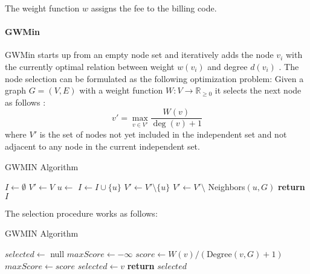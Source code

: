 The weight function $w$ assigns the fee to the billing code.




\paragraph{GWMin}
GWMin starts up from an empty node set and iteratively adds the node $v_i$ with the currently optimal relation between weight $w(v_i)$ and degree $d(v_i)$ \cite{SAKAI2003313}.
The node selection can be formulated as the following optimization problem:
Given a graph $G = (V, E)$ with a weight function $W: V \to \mathbb{R}_{\geq 0}$ it selects the next node as follows :
\[
    v' = \max_{v \in V'} \frac{W(v)}{\deg(v) + 1}
\]
where $V'$ is the set of nodes not yet included in the independent set and not adjacent to any node in the current independent set.


\begin{algorithm}
    \caption{GWMIN Algorithm}
    \begin{algorithmic}[1]
            \State $I \gets \emptyset$ 
            \State $V' \gets V$ 
                \State $u \gets$ 
                \State $I \gets I \cup \{u\}$ 
                \State $V' \gets V' \setminus \{u\}$ 
                \State $V' \gets V' \setminus$ Neighbors$(u, G)$ 
            \EndWhile
            \State \textbf{return} $I$
        \EndProcedure
    \end{algorithmic}\label{alg:algorithm-gwmin}
\end{algorithm}

The selection procedure works as follows:

\begin{algorithm}
    \caption{GWMIN Algorithm}
    \begin{algorithmic}[1]
            \State $selected \gets$ null
            \State $maxScore \gets -\infty$
                \State $score \gets W(v) / (\text{Degree}(v, G) + 1)$
                    \State $maxScore \gets score$
                    \State $selected \gets v$
                \EndIf
            \EndFor
            \State \textbf{return} $selected$
        \EndProcedure
    \end{algorithmic}\label{alg:algorithm-gwin-selection}
\end{algorithm}



